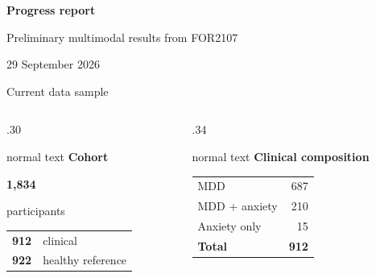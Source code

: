 \documentclass[aspectratio=169,10pt]{beamer}
\newcommand{\panel}[1]{{\color{Navy}\bfseries\small #1}}
\begin{document}
\begin{frame}[plain]
  \vspace{.3cm}
  {\color{Navy}\fontsize{27}{31}\selectfont\bfseries Progress report\par}
  \vspace{.18cm}
  {\color{Muted}\Large Preliminary multimodal results from FOR2107\par}
  \vspace{.45cm}
  \vfill
  {\color{Muted}\small29 September 2026}
\end{frame}

\begin{frame}{Current data sample}
\begin{columns}[T,onlytextwidth]
\begin{column}{.30\textwidth}
\begin{beamercolorbox}[rounded=true,sep=.28cm,wd=\linewidth]{normal text}
\panel{Cohort}\par\vspace{.12cm}
{\color{Navy}\fontsize{30}{32}\selectfont\bfseries 1,834}\par
\color{Muted}\small participants\par\vspace{.18cm}
\begin{tabular}{@{}r l@{}}
{\color{Teal}\fontsize{21}{23}\selectfont\bfseries 912} & \color{Muted}\small clinical\\
{\color{Teal}\fontsize{21}{23}\selectfont\bfseries 922} & \color{Muted}\small healthy reference
\end{tabular}
\end{beamercolorbox}
\end{column}
\begin{column}{.34\textwidth}
\begin{beamercolorbox}[rounded=true,sep=.28cm,wd=\linewidth]{normal text}
\panel{Clinical composition}\par\vspace{.1cm}
\renewcommand{\arraystretch}{1.35}
\begin{tabular}{@{}lr@{}}
MDD & 687\\
MDD + anxiety & 210\\
Anxiety only & 15\\
\midrule
\textbf{Total} & \textbf{912}
\end{tabular}
\vspace{.12cm}\par\color{Muted}
\end{beamercolorbox}
\end{column}

\end{columns}
\end{frame}
\end{document}
